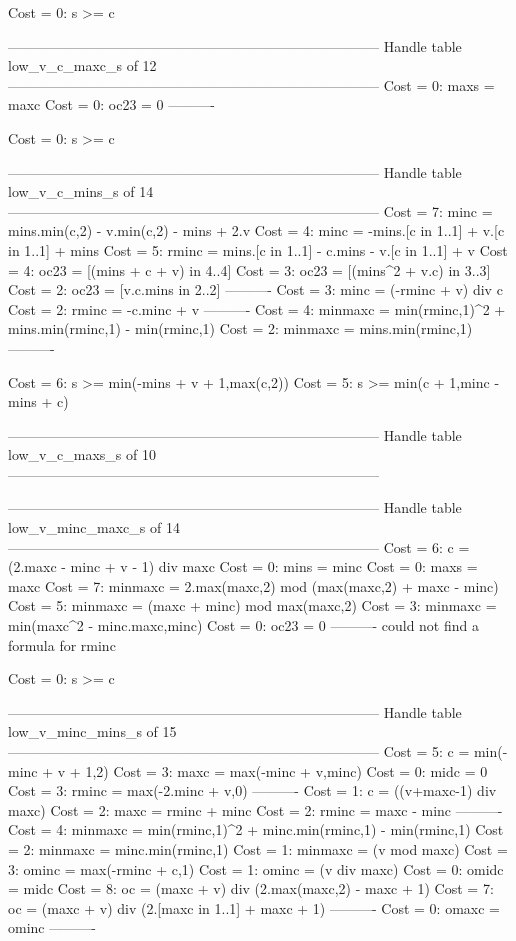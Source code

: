 Cost =  0:  s >= c

--------------------------------------------------------------------------------
Handle table low_v_c_maxc_s of 12
--------------------------------------------------------------------------------
Cost =  0:  maxs = maxc
Cost =  0:  oc23 = 0
----------

Cost =  0:  s >= c

--------------------------------------------------------------------------------
Handle table low_v_c_mins_s of 14
--------------------------------------------------------------------------------
Cost =  7:  minc    = mins.min(c,2) - v.min(c,2) - mins + 2.v
Cost =  4:  minc    = -mins.[c in 1..1] + v.[c in 1..1] + mins
Cost =  5:  rminc   = mins.[c in 1..1] - c.mins - v.[c in 1..1] + v
Cost =  4:  oc23    = [(mins + c + v) in 4..4]
Cost =  3:  oc23    = [(mins^2 + v.c) in 3..3]
Cost =  2:  oc23    = [v.c.mins in 2..2]
----------
Cost =  3:  minc    = (-rminc + v) div c
Cost =  2:  rminc   = -c.minc + v
----------
Cost =  4:  minmaxc = min(rminc,1)^2 + mins.min(rminc,1) - min(rminc,1)
Cost =  2:  minmaxc = mins.min(rminc,1)
----------

Cost =  6:  s >= min(-mins + v + 1,max(c,2))
Cost =  5:  s >= min(c + 1,minc - mins + c)

--------------------------------------------------------------------------------
Handle table low_v_c_maxs_s of 10
--------------------------------------------------------------------------------


--------------------------------------------------------------------------------
Handle table low_v_minc_maxc_s of 14
--------------------------------------------------------------------------------
Cost =  6:  c       = (2.maxc - minc + v - 1) div maxc
Cost =  0:  mins    = minc
Cost =  0:  maxs    = maxc
Cost =  7:  minmaxc = 2.max(maxc,2) mod (max(maxc,2) + maxc - minc)
Cost =  5:  minmaxc = (maxc + minc) mod max(maxc,2)
Cost =  3:  minmaxc = min(maxc^2 - minc.maxc,minc)
Cost =  0:  oc23    = 0
----------
could not find a formula for rminc

Cost =  0:  s >= c

--------------------------------------------------------------------------------
Handle table low_v_minc_mins_s of 15
--------------------------------------------------------------------------------
Cost =  5:  c       = min(-minc + v + 1,2)
Cost =  3:  maxc    = max(-minc + v,minc)
Cost =  0:  midc    = 0
Cost =  3:  rminc   = max(-2.minc + v,0)
----------
Cost =  1:  c       = ((v+maxc-1) div maxc)
Cost =  2:  maxc    = rminc + minc
Cost =  2:  rminc   = maxc - minc
----------
Cost =  4:  minmaxc = min(rminc,1)^2 + minc.min(rminc,1) - min(rminc,1)
Cost =  2:  minmaxc = minc.min(rminc,1)
Cost =  1:  minmaxc = (v mod maxc)
Cost =  3:  ominc   = max(-rminc + c,1)
Cost =  1:  ominc   = (v div maxc)
Cost =  0:  omidc   = midc
Cost =  8:  oc      = (maxc + v) div (2.max(maxc,2) - maxc + 1)
Cost =  7:  oc      = (maxc + v) div (2.[maxc in 1..1] + maxc + 1)
----------
Cost =  0:  omaxc   = ominc
----------

